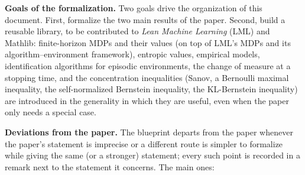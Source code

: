 \textbf{Goals of the formalization.} Two goals drive the organization of this document.
First, formalize the two main results of the paper. Second, build a reusable library, to be
contributed to \emph{Lean Machine Learning} (LML) and Mathlib: finite-horizon MDPs and their
values (on top of LML's MDPs and its algorithm--environment framework), entropic values,
empirical models, identification algorithms for episodic environments, the change of measure at
a stopping time, and the concentration inequalities (Sanov, a Bernoulli maximal inequality, the
self-normalized Bernstein inequality, the KL-Bernstein inequality) are introduced in the
generality in which they are useful, even when the paper only needs a special case.

\textbf{Deviations from the paper.} The blueprint departs from the paper whenever the paper's
statement is imprecise or a different route is simpler to formalize while giving the same (or
a stronger) statement; every such point is recorded in a remark next to the statement it
concerns. The main ones:
